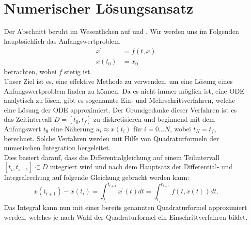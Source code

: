 \section{Numerischer Lösungsansatz}
Der Abschnitt beruht im Wesentlichen auf \cite{peterdeuflhardfolkmarbornemannNumerischeMathematikGewohnliche} und
\cite{ernsthairergerhardwannerSolvingOrdinaryDifferential}. Wir werden uns im Folgenden hauptsächlich das
Anfangswertproblem
\begin{align}
    \label{first-order-num}
    x^{\prime} &= f(t,x) \nonumber \\
    x(t_0) &= x_0
\end{align}
betrachten, wobei $f$ stetig ist.\\
Unser Ziel ist es, eine effektive Methode zu verwenden, um eine Lösung eines Anfangswertproblem finden zu können.
Da es nicht immer möglich ist, eine ODE analytisch zu lösen, gibt es sogenannte Ein- und Mehrschrittverfahren, welche
eine Lösung der ODE approximiert.
Der Grundgedanke dieser Verfahren ist es das Zeitintervall $D=[t_0,t_f]$ zu diskretisieren und beginnend mit dem
Anfangswert $t_0$ eine Näherung $u_i \approx x(t_i)$ für $i=0 \dots N$, wobei $t_N=t_f$, berechnet.
Solche Verfahren werden mit Hilfe von Quadraturformeln der numerischen
Integration \cite[Numerische Integration]{walzLexikonMathematik} hergeleitet.\\
Dies basiert darauf, dass die Differentialgleichung auf einem Teilintervall $[t_i, t_{i+1}] \subset D$
integriert wird und nach dem Hauptsatz der Differential- und Integralrechung auf folgende Gleichung gebracht werden kann:
\[
    x(t_{i+1}) - x(t_i) = \int_{t_i}^{t_{i+1}} x^{\prime}(t)dt = \int_{t_i}^{t_{i+1}}f(t, x(t))dt.
\]
Das Integral kann nun mit einer bereits genannten Quadraturformel approximiert werden, welches je nach Wahl der
Quadraturformel ein Einschrittverfahren bildet.
